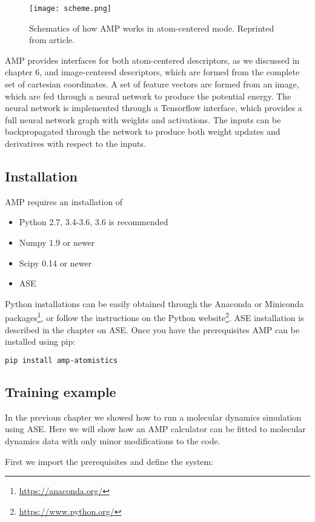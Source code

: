 \begin{figure}[h]
\centering
\texttt{[image: scheme.png]}
\caption{Schematics of how AMP works in atom-centered mode.
    Reprinted from {article}.}
\label{fig:scheme}
\end{figure}

AMP provides interfaces for both atom-centered descriptors, as we
discussed in chapter 6, and image-centered descriptors,
which are formed from the complete set of cartesian coordinates.
A set of feature vectors are formed from an image, which are fed
through a neural network to produce the potential energy.
The neural network is implemented through a Tensorflow interface,
which provides a full neural network graph with weights and
activations. The inputs can be backpropagated through the network
to produce both weight updates and derivatives with respect to
the inputs.

\subsection{Installation}
AMP requires an installation of

\begin{itemize}
    \item Python 2.7, 3.4-3.6, 3.6 is recommended
    \item Numpy 1.9 or newer
    \item Scipy 0.14 or newer
    \item ASE
\end{itemize}

Python installations can be easily obtained through the Anaconda 
or Miniconda packages\footnote{\url{https://anaconda.org/}},
or follow the instructions on the Python website\footnote{
\url{https://www.python.org/}}.
ASE installation is described in the chapter on ASE.
Once you have the prerequisites AMP can be installed using pip:

\begin{lstlisting}[language=bash]
pip install amp-atomistics
\end{lstlisting}

\subsection{Training example}
In the previous chapter we showed how to run a molecular dynamics
simulation using ASE. Here we will show how an AMP calculator
can be fitted to molecular dynamics data with only minor
modifications to the code.
\par
First we import the prerequisites and define the system:

